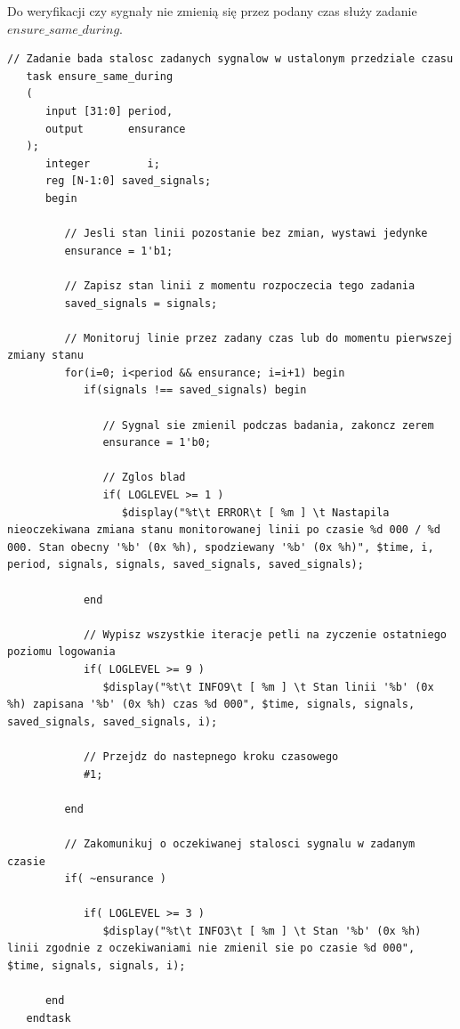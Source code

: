 \documentclass[a4paper,12pt]{article}
\begin{document}
Do weryfikacji czy sygnały nie zmienią się przez podany czas służy zadanie $ensure\_same\_during$.
\begin{lstlisting}[label=Monitor,caption=Monitor.v,firstnumber=90]
   // Zadanie bada stalosc zadanych sygnalow w ustalonym przedziale czasu
   task ensure_same_during
   (
      input [31:0] period,
      output       ensurance
   );
      integer         i;
      reg [N-1:0] saved_signals;
      begin

         // Jesli stan linii pozostanie bez zmian, wystawi jedynke
         ensurance = 1'b1;

         // Zapisz stan linii z momentu rozpoczecia tego zadania
         saved_signals = signals;

         // Monitoruj linie przez zadany czas lub do momentu pierwszej zmiany stanu
         for(i=0; i<period && ensurance; i=i+1) begin
            if(signals !== saved_signals) begin

               // Sygnal sie zmienil podczas badania, zakoncz zerem
               ensurance = 1'b0;

               // Zglos blad
               if( LOGLEVEL >= 1 )
                  $display("%t\t ERROR\t [ %m ] \t Nastapila nieoczekiwana zmiana stanu monitorowanej linii po czasie %d 000 / %d 000. Stan obecny '%b' (0x %h), spodziewany '%b' (0x %h)", $time, i, period, signals, signals, saved_signals, saved_signals);

            end

            // Wypisz wszystkie iteracje petli na zyczenie ostatniego poziomu logowania
            if( LOGLEVEL >= 9 )
               $display("%t\t INFO9\t [ %m ] \t Stan linii '%b' (0x %h) zapisana '%b' (0x %h) czas %d 000", $time, signals, signals, saved_signals, saved_signals, i);

            // Przejdz do nastepnego kroku czasowego
            #1;

         end

         // Zakomunikuj o oczekiwanej stalosci sygnalu w zadanym czasie
         if( ~ensurance )

            if( LOGLEVEL >= 3 )
               $display("%t\t INFO3\t [ %m ] \t Stan '%b' (0x %h) linii zgodnie z oczekiwaniami nie zmienil sie po czasie %d 000", $time, signals, signals, i);

      end
   endtask
\end{lstlisting}
\end{document}
